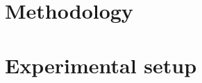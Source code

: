 \documentclass[conference]{IEEEtran}
\begin{document}
\section{Methodology}\label{sec:method}

\section{Experimental setup}
\end{document}
